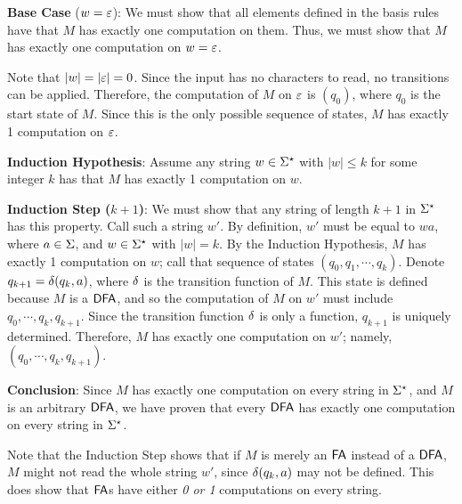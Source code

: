 \begin{proofstructuralinduction}[$|w|$]
	\item \textbf{Base Case} ($w = \varepsilon$): We must show that all elements defined in the basis rules have that $M$ has exactly one computation on them. Thus, we must show that $M$ has exactly one computation on $w = \varepsilon$. 
	
	Note that $|w| = |\varepsilon| = 0$. Since the input has no characters to read, no transitions can be applied. Therefore, the computation of $M$ on $\varepsilon$ is $(q_0)$, where $q_0$ is the start state of $M$.
	Since this is the only possible sequence of states, $M$ has exactly 1 computation on $\varepsilon$.
	
	\item \textbf{Induction Hypothesis}: Assume any string $w \in \Sigma^\star$ with $|w| \le k$ for some integer $k$ has that $M$ has exactly 1 computation on $w$.
	
	\item \textbf{Induction Step ($k+1$)}: We must show that any string of length $k+1$ in $\Sigma^\star$ has this property.
	Call such a string $w'$. 
	By definition, $w'$ must be equal to $wa$, where $a \in \Sigma$, and $w \in \Sigma^\star$ with $|w| = k$.
	By the Induction Hypothesis, $M$ has exactly 1 computation on $w$; call that sequence of states $(q_0, q_1, \cdots, q_k)$.
	Denote $q_{k+1} = \delta(q_k, a)$, where $\delta$ is the transition function of $M$.
	This state is defined because $M$ is a $\textsf{DFA}$, and so the computation of $M$ on $w'$ must include $q_0, \cdots, q_k, q_{k+1}$.
	Since the transition function $\delta$ is only a function, $q_{k+1}$ is uniquely determined. 
	Therefore, $M$ has exactly one computation on $w'$; namely, $(q_0, \cdots, q_k, q_{k+1})$.
	
	\item \textbf{Conclusion}: Since $M$ has exactly one computation on every string in $\Sigma^\star$, and $M$ is an arbitrary $\textsf{DFA}$, we have proven that every $\textsf{DFA}$ has exactly one computation on every string in $\Sigma^\star$.
\end{proofstructuralinduction}

Note that the Induction Step shows that if $M$ is merely an $\textsf{FA}$ instead of a $\textsf{DFA}$, $M$ might not read the whole string $w'$, since $\delta(q_k, a)$ may not be defined.
This does show that $\textsf{FA}$s have either \emph{0 or 1} computations on every string.

